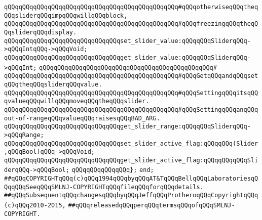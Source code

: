\verb|qQQqqQQqqQQqqQQqqQQqqQQqqQQqqQQqqQQqqQQqqQQqqQQq#qQQqotherwiseqQQqtheqQQqsliderqQQqimpqQQqwillqQQqblock,|\newline
\verb|qQQqqQQqqQQqqQQqqQQqqQQqqQQqqQQqqQQqqQQqqQQqqQQq#qQQqfreezingqQQqtheqQQqsliderqQQqdisplay.|\newline
\newline
\verb|qQQqqQQqqQQqqQQqqQQqqQQqqQQqqQQqset_slider_value:qQQqqQQqSliderqQQq->qQQqIntqQQq->qQQqVoid;|\newline
\verb|qQQqqQQqqQQqqQQqqQQqqQQqqQQqqQQqget_slider_value:qQQqqQQqSliderqQQq->qQQqInt;|\newline
\verb|qQQqqQQqqQQqqQQqqQQqqQQqqQQqqQQqqQQqqQQqqQQqqQQq#|\newline
\verb|qQQqqQQqqQQqqQQqqQQqqQQqqQQqqQQqqQQqqQQqqQQqqQQq#qQQqGetqQQqandqQQqsetqQQqtheqQQqsliderqQQqvalue.|\newline
\verb|qQQqqQQqqQQqqQQqqQQqqQQqqQQqqQQqqQQqqQQqqQQqqQQq#qQQqSettingqQQqitsqQQqvalueqQQqwillqQQqmoveqQQqtheqQQqslider.|\newline
\verb|qQQqqQQqqQQqqQQqqQQqqQQqqQQqqQQqqQQqqQQqqQQqqQQq#qQQqSettingqQQqanqQQqout-of-rangeqQQqvalueqQQqraisesqQQqBAD_ARG.|\newline
\newline
\verb|qQQqqQQqqQQqqQQqqQQqqQQqqQQqqQQqget_slider_range:qQQqqQQqSliderqQQq->qQQqRange;|\newline
\newline
\verb|qQQqqQQqqQQqqQQqqQQqqQQqqQQqqQQqset_slider_active_flag:qQQqqQQq(Slider,qQQqBool)qQQq->qQQqVoid;|\newline
\verb|qQQqqQQqqQQqqQQqqQQqqQQqqQQqqQQqget_slider_active_flag:qQQqqQQqqQQqSliderqQQq->qQQqBool;|\newline
\verb|qQQqqQQqqQQqqQQq};|\newline
\verb|end;|\newline
\newline
\verb|##qQQqCOPYRIGHTqQQq(c)qQQq1994qQQqbyqQQqAT&TqQQqBellqQQqLaboratoriesqQQqqQQqSeeqQQqSMLNJ-COPYRIGHTqQQqfileqQQqforqQQqdetails.|\newline
\verb|##qQQqSubsequentqQQqchangesqQQqbyqQQqJeffqQQqProtheroqQQqCopyrightqQQq(c)qQQq2010-2015,|\newline
\verb|##qQQqreleasedqQQqperqQQqtermsqQQqofqQQqSMLNJ-COPYRIGHT.|\newline

